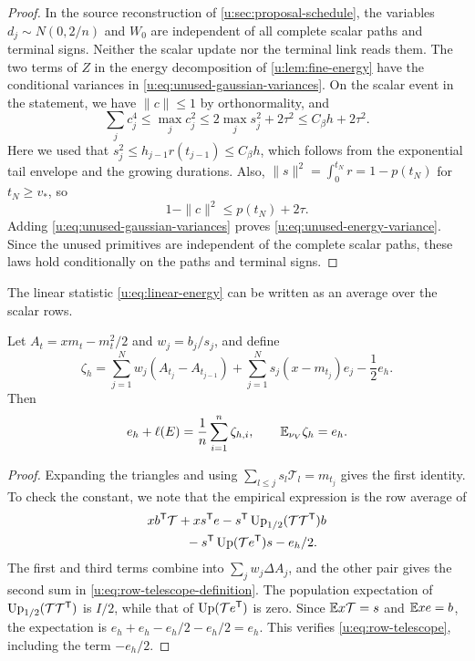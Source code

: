 \begin{proof}
In the source reconstruction of \cref{u:sec:proposal-schedule}, the variables $d_j\sim N(0,2/n)$ and $W_0$ are independent of all complete scalar paths and terminal signs. Neither the scalar update nor the terminal link reads them. The two terms of $Z$ in the energy decomposition of \cref{u:lem:fine-energy} have the conditional variances in \eqref{u:eq:unused-gaussian-variances}. On the scalar event in the statement, we have $\|c\|\le1$ by orthonormality, and
\[
 \sum_jc_j^4\le\max_jc_j^2
 \le2\max_js_j^2+2\tau^2\le C_\beta h+2\tau^2.
\]
Here we used that $s_j^2\le h_{j-1}r(t_{j-1})\le C_\beta h$, which follows from the exponential tail envelope and the growing durations. Also, $\|s\|^2=\int_0^{t_N}r=1-p(t_N)$ for $t_N\ge v_*$, so
\[
 1-\|c\|^2\le p(t_N)+2\tau.
\]
Adding \eqref{u:eq:unused-gaussian-variances} proves \eqref{u:eq:unused-energy-variance}. Since the unused primitives are independent of the complete scalar paths, these laws hold conditionally on the paths and terminal signs.
\end{proof}

The linear statistic \eqref{u:eq:linear-energy} can be written as an average over the scalar rows.

\begin{lemma}\label{u:lem:telescope}
Let $A_t=xm_t-m_t^2/2$ and $w_j=b_j/s_j$, and define
\begin{equation}\label{u:eq:row-telescope-definition}
 \zeta_h=\sum_{j=1}^Nw_j(A_{t_j}-A_{t_{j-1}})
       +\sum_{j=1}^Ns_j(x-m_{t_j})e_j-\frac12e_h.
\end{equation}
Then
\begin{equation}\label{u:eq:row-telescope}
 e_h+\ell(E)=\frac1n\sum_{i=1}^n\zeta_{h,i},\qquad
 \mathbb E_{\nu_V}\zeta_h=e_h.
\end{equation}
\end{lemma}

\begin{proof}
Expanding the triangles and using $\sum_{l\le j}s_l\mathcal T_l=m_{t_j}$ gives the first identity. To check the constant, we note that the empirical expression is the row average of
\begin{align*}
 &xb^{\mathsf T}\mathcal T+xs^{\mathsf T}e
 -s^{\mathsf T}\operatorname{Up}_{1/2}(\mathcal T\mathcal T^{\mathsf T})b\\
 &\hspace{3em}-s^{\mathsf T}\operatorname{Up}(\mathcal T e^{\mathsf T})s-e_h/2.
\end{align*}
The first and third terms combine into $\sum_jw_j\Delta A_j$, and the other pair gives the second sum in \eqref{u:eq:row-telescope-definition}. The population expectation of $\operatorname{Up}_{1/2}(\mathcal T\mathcal T^{\mathsf T})$ is $I/2$, while that of $\operatorname{Up}(\mathcal T e^{\mathsf T})$ is zero. Since $\mathbb E x\mathcal T=s$ and $\mathbb E xe=b$, the expectation is $e_h+e_h-e_h/2-e_h/2=e_h$. This verifies \eqref{u:eq:row-telescope}, including the term $-e_h/2$.
\end{proof}

